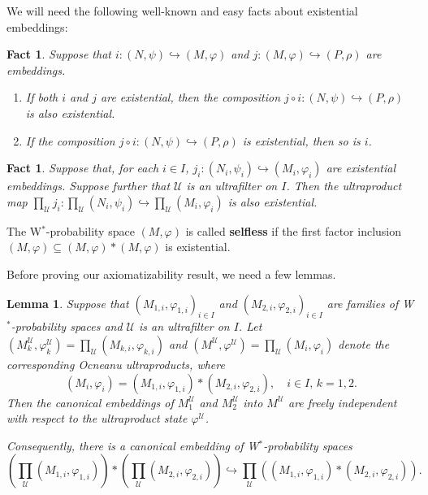\documentclass[12pt]{amsart}
\newtheorem{lem}[thm]{Lemma}
\newtheorem{fact}[thm]{Fact}
\theoremstyle{definition}
\def\cal{\mathcal}
\def\u{\mathsf 1}
\newcommand\cU{{\cal U}}
\def \u{\mathcal U}
\begin{document}
We will need the following well-known and easy facts about existential embeddings:

\begin{fact}\label{ecembeddingfact1}
Suppose that $i:(N,\psi)\hookrightarrow (M,\varphi)$ and $j:(M,\varphi)\hookrightarrow (P,\rho)$ are embeddings.
\begin{enumerate}
    \item  If both $i$ and $j$ are existential, then the composition $j\circ i:(N,\psi)\hookrightarrow (P,\rho)$ is also existential.
    \item If the composition $j\circ i:(N,\psi)\hookrightarrow (P,\rho)$ is existential, then so is $i$.
\end{enumerate}
\end{fact}

\begin{fact}\label{ecembeddingfact2}
Suppose that, for each $i\in I$, $j_i:(N_i,\psi_i)\hookrightarrow (M_i,\varphi_i)$ are existential embeddings.  Suppose further that $\u$ is an ultrafilter on $I$.  Then the ultraproduct map $\prod_\u j_i:\prod_\u (N_i,\psi_i)\hookrightarrow \prod_\u (M_i,\varphi_i)$ is also existential. 
\end{fact}

The W$^*$-probability space $(M,\varphi)$ is called \textbf{selfless} if the first factor inclusion $(M,\varphi)\subseteq (M,\varphi)*(M,\varphi)$ is existential.

Before proving our axiomatizability result, we need a few lemmas.

\begin{lem}\label{inducedembedding}
Suppose that $(M_{1,i},\varphi_{1,i})_{i\in I}$ and $(M_{2,i},\varphi_{2,i})_{i\in I}$ are families of W$^*$-probability spaces and $\u$ is an ultrafilter on $I$. 
Let $(M_k^{\cU},\varphi_k^{\cU})=\prod_{\cU}(M_{k,i},\varphi_{k,i})$ and $(M^{\cU},\varphi^{\cU})=\prod_{\cU}(M_i,\varphi_i)$ denote the corresponding Ocneanu ultraproducts, where $$(M_i,\varphi_i)=(M_{1,i},\varphi_{1,i})*(M_{2,i},\varphi_{2,i}), \quad i\in I,\,k=1,2.$$ 
Then the canonical embeddings of $M_1^\mathcal{U}$ and $M_2^\mathcal{U}$ into $M^\mathcal{U}$ are freely independent with respect to the ultraproduct state $\varphi^\mathcal{U}$. 

Consequently, there is a canonical embedding of W$^*$-probability spaces 
$$(\prod_\u (M_{1,i},\varphi_{1,i}))*(\prod_\u (M_{2,i},\varphi_{2,i}))\hookrightarrow \prod_\u ((M_{1,i},\varphi_{1,i})*(M_{2,i},\varphi_{2,i})).$$
\end{lem}
\end{document}
